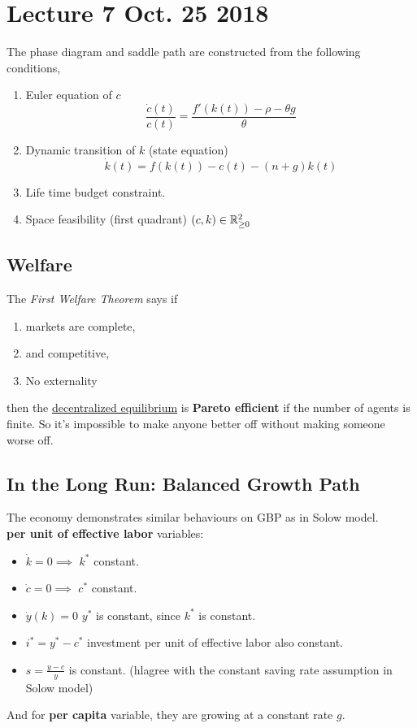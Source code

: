 \documentclass[11pt]{article}
\begin{document}
	\section{Lecture 7 Oct. 25 2018}
		\begin{remark} The phase diagram and saddle path are constructed from the following conditions,
			\begin{enumerate}
				\item Euler equation of $c$ \[ \frac{\dot{c}(t)}{c(t)} = \frac{f'(k(t)) - \rho - \theta g}{\theta} \]
				\item Dynamic transition of $k$ (state equation) \[ \dot{k}(t) = f(k(t)) - c(t) - (n+g)k(t) \]
				\item Life time budget constraint.
				\item Space feasibility (first quadrant) $(c,k) \in \mathbb{R}_{\geq 0}^2$
			\end{enumerate}
		\end{remark}
		
		\subsection{Welfare}
			\par The \emph{First Welfare Theorem} says if 
			\begin{enumerate}
				\item markets are complete,
				\item and competitive,
				\item No externality
			\end{enumerate} then the \ul{decentralized equilibrium} is \textbf{Pareto efficient} if the number of agents is finite. So it's impossible to make anyone better off without making someone worse off.
		
		\subsection{In the Long Run: Balanced Growth Path}
			\par The economy demonstrates similar behaviours on GBP as in Solow model. \\
			\textbf{per unit of effective labor} variables: 
			\begin{itemize}
				\item $\dot{k}=0\implies$ $k^*$ constant.
				\item $\dot{c}=0\implies$ $c^*$ constant.
				\item $\dot{y}(k)=0$ $y^*$ is constant, since $k^*$ is constant.
				\item $i^* = y^* - c^*$ investment per unit of effective labor also constant.
				\item $s = \frac{y-c}{y}$ is constant. (hl{agree with the constant saving rate assumption in Solow model})
			\end{itemize}
			And for \textbf{per capita} variable, they are growing at a constant rate $g$.
			
\end{document}
